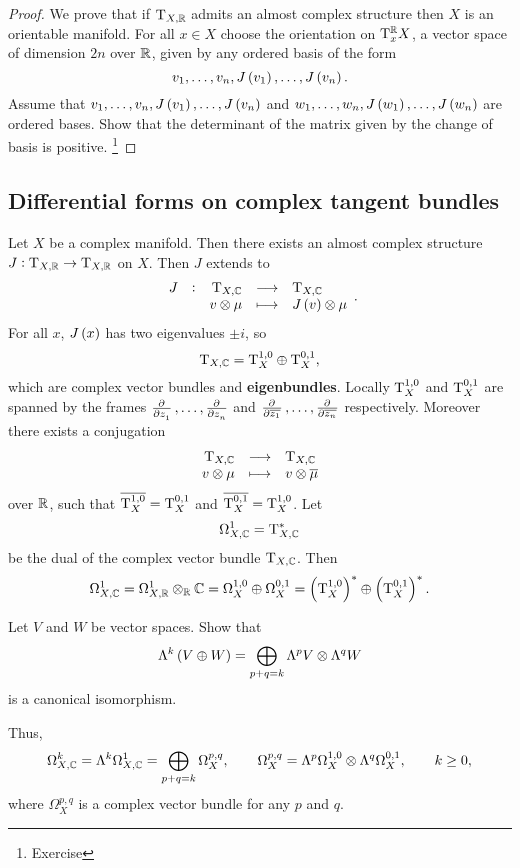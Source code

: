 \begin{proof}
We prove that if $ \mathrm{T}_{X, \mathbb{R}} $ admits an almost complex structure then $ X $ is an orientable manifold. For all $ x \in X $ choose the orientation on $ \mathrm{T}_x^{\mathbb{R}} X $, a vector space of dimension $ 2n $ over $ \mathbb{R} $, given by any ordered basis of the form
$$ v_1, \dots, v_n, J\br{v_1}, \dots, J\br{v_n}. $$
Assume that $ v_1, \dots, v_n, J\br{v_1}, \dots, J\br{v_n} $ and $ w_1, \dots, w_n, J\br{w_1}, \dots, J\br{w_n} $ are ordered bases. Show that the determinant of the matrix given by the change of basis is positive. \footnote{Exercise}
\end{proof}

\pagebreak

\subsection{Differential forms on complex tangent bundles}

Let $ X $ be a complex manifold. Then there exists an almost complex structure $ J : \mathrm{T}_{X, \mathbb{R}} \to \mathrm{T}_{X, \mathbb{R}} $ on $ X $. Then $ J $ extends to
$$ \function[J]{\T_{X, \CC}}{\T_{X, \CC}}{v \otimes \mu}{J\br{v} \otimes \mu}. $$
For all $ x $, $ J\br{x} $ has two eigenvalues $ \pm i $, so
$$ \mathrm{T}_{X, \mathbb{C}} = \mathrm{T}_X^{1, 0} \oplus \mathrm{T}_X^{0, 1}, $$
which are complex vector bundles and \textbf{eigenbundles}. Locally $ \mathrm{T}_X^{1, 0} $ and $ \mathrm{T}_X^{0, 1} $ are spanned by the frames $ \tpd{}{z_1}, \dots, \tpd{}{z_n} $ and $ \tpd{}{\overline{z_1}}, \dots, \tpd{}{\overline{z_n}} $ respectively. Moreover there exists a conjugation
$$ \function{\T_{X, \CC}}{\T_{X, \CC}}{v \otimes \mu}{v \otimes \overline{\mu}} $$
over $ \mathbb{R} $, such that $ \overline{\mathrm{T}_X^{1, 0}} = \mathrm{T}_X^{0, 1} $ and $ \overline{\mathrm{T}_X^{0, 1}} = \mathrm{T}_X^{1, 0} $. Let
$$ \Omega_{X, \mathbb{C}}^1 = \mathrm{T}_{X, \mathbb{C}}^* $$
be the dual of the complex vector bundle $ \mathrm{T}_{X, \mathbb{C}} $. Then
$$ \Omega_{X, \CC}^1 = \Omega_{X, \RR}^1 \otimes_\RR \CC = \Omega_X^{1, 0} \oplus \Omega_X^{0, 1} = \br{\T_X^{1, 0}}^* \oplus \br{\T_X^{0, 1}}^*. $$

\begin{exercise*}
Let $ V $ and $ W $ be vector spaces. Show that
$$ \Lambda^k\br{V \oplus W} = \bigoplus_{p + q = k} \Lambda^pV \otimes \Lambda^qW $$
is a canonical isomorphism.
\end{exercise*}


Thus,
$$ \Omega_{X, \mathbb{C}}^k = \Lambda^k\Omega_{X, \mathbb{C}}^1 = \bigoplus_{p + q = k} \Omega_X^{p, q}, \qquad \Omega_X^{p, q} = \Lambda^p\Omega_X^{1, 0} \otimes \Lambda^q\Omega_X^{0, 1}, \qquad k \ge 0, $$
where $ \Omega_X^{p, q} $ is a complex vector bundle for any $ p $ and $ q $.

